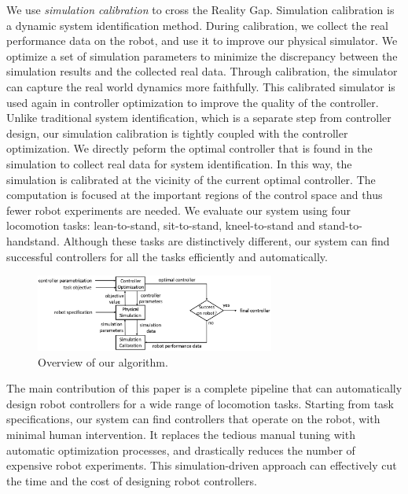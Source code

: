 We use \emph{simulation calibration} to cross the Reality Gap. Simulation calibration is a dynamic system identification method. During calibration, we collect the real performance data on the robot, and use it to improve our physical simulator. We optimize a set of simulation parameters to minimize the discrepancy between the simulation results and the collected real data. Through calibration, the simulator can capture the real world dynamics more faithfully. This calibrated simulator is used again in controller optimization to improve the quality of the controller. Unlike traditional system identification, which is a separate step from controller design, our simulation calibration is tightly coupled with the controller optimization. We directly peform the optimal controller that is found in the simulation to collect real data for system identification. In this way, the simulation is calibrated at the vicinity of the current optimal controller. The computation is focused at the important regions of the control space and thus fewer robot experiments are needed. We evaluate our system using four locomotion tasks: lean-to-stand, sit-to-stand, kneel-to-stand and stand-to-handstand. Although these tasks are distinctively different, our system can find successful controllers for all the tasks efficiently and automatically. 

\begin{figure}[!t]
  \centering
  \includegraphics[width=0.7\textwidth]{figures/controllerTransfer}
  \caption{Overview of our algorithm.}
  \label{fig:controllerTransferOverview}
\end{figure}

The main contribution of this paper is a complete pipeline that can automatically design robot controllers for a wide range of locomotion tasks. Starting from task specifications, our system can find controllers that operate on the robot, with minimal human intervention. It replaces the tedious manual tuning with automatic optimization processes, and drastically reduces the number of expensive robot experiments. This simulation-driven approach can effectively cut the time and the cost of designing robot controllers.
